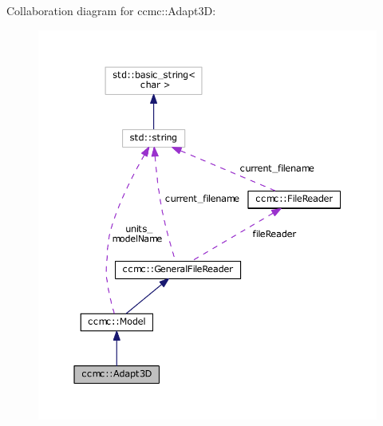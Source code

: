 Collaboration diagram for ccmc\-:\-:Adapt3\-D\-:\nopagebreak
\begin{figure}[H]
\begin{center}
\leavevmode
\includegraphics[width=350pt]{classccmc_1_1_adapt3_d__coll__graph}
\end{center}
\end{figure}
